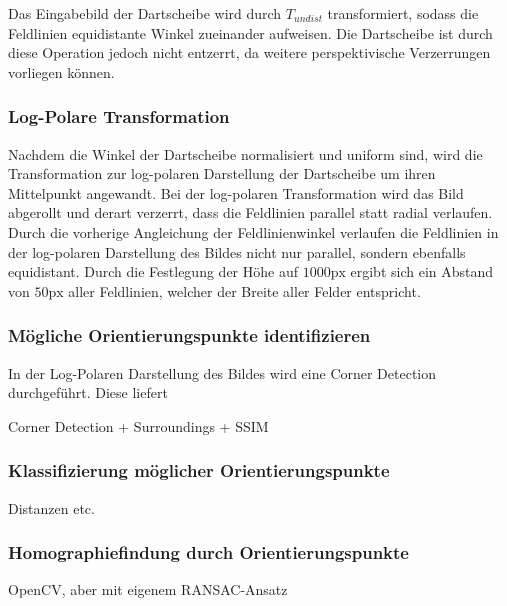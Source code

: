 Das Eingabebild der Dartscheibe wird durch $T_{undist}$ transformiert, sodass die Feldlinien equidistante Winkel zueinander aufweisen. Die Dartscheibe ist durch diese Operation jedoch nicht entzerrt, da weitere perspektivische Verzerrungen vorliegen können.

\subsubsection{Log-Polare Transformation}
\label{sec:impl:cv:orient:logpolar}

Nachdem die Winkel der Dartscheibe normalisiert und uniform sind, wird die Transformation zur log-polaren Darstellung der Dartscheibe um ihren Mittelpunkt angewandt. Bei der log-polaren Transformation wird das Bild abgerollt und derart verzerrt, dass die Feldlinien parallel statt radial verlaufen. Durch die vorherige Angleichung der Feldlinienwinkel verlaufen die Feldlinien in der log-polaren Darstellung des Bildes nicht nur parallel, sondern ebenfalls equidistant. Durch die Festlegung der Höhe auf $1000\text{px}$ ergibt sich ein Abstand von $50\text{px}$ aller Feldlinien, welcher der Breite aller Felder entspricht.

\subsubsection{Mögliche Orientierungspunkte identifizieren}
\label{sec:impl:cv:orient:points}

In der Log-Polaren Darstellung des Bildes wird eine Corner Detection durchgeführt. Diese liefert

Corner Detection + Surroundings + SSIM

\subsubsection{Klassifizierung möglicher Orientierungspunkte}
\label{sec:impl:cv:orient:sorting}
Distanzen etc.

\subsubsection{Homographiefindung durch Orientierungspunkte}
\label{sec:impl:cv:orient:homography}
OpenCV, aber mit eigenem RANSAC-Ansatz

